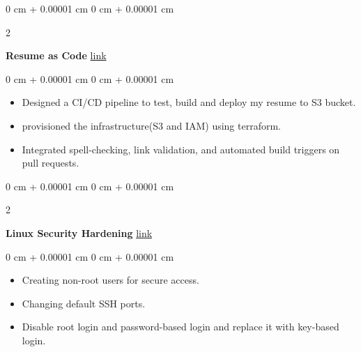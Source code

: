 \documentclass[10pt, letterpaper]{article}
\newenvironment{highlights}{
    \begin{itemize}[
        topsep=0.10 cm,
        parsep=0.10 cm,
        partopsep=0pt,
        itemsep=0pt,
        leftmargin=0 cm + 10pt
    ]
}{
    \end{itemize}
} %
\newenvironment{onecolentry}{
    \begin{adjustwidth}{
        0 cm + 0.00001 cm
    }{
        0 cm + 0.00001 cm
    }
}{
    \end{adjustwidth}
} %
\newenvironment{twocolentry}[2][]{
    \onecolentry
    \def\secondColumn{#2}
    \setcolumnwidth{\fill, 4.5 cm}
    \begin{paracol}{2}
}{
    \switchcolumn \raggedleft \secondColumn
    \end{paracol}
    \endonecolentry
} %
\begin{document}
        \vspace{0.2 cm}

        \begin{twocolentry}{
            \href{https://github.com/Charan-Sharan/resume-as-code}{link}
        }
            \textbf{Resume as Code}\end{twocolentry}

        \vspace{0.10 cm}
        \begin{onecolentry}
            \begin{highlights}
                \item Designed a CI/CD pipeline to test, build and deploy my resume to S3 bucket.
                \item provisioned the infrastructure(S3 and IAM) using terraform.
                \item Integrated spell-checking, link validation, and automated build triggers on pull requests.
            \end{highlights}
        \end{onecolentry}
        \vspace{0.2 cm}

        \begin{twocolentry}{
            \href{https://github.com/Charan-Sharan/LinuxSecurityHardening}{link}
        }
            \textbf{Linux Security Hardening}\end{twocolentry}

        \vspace{0.10 cm}
        \begin{onecolentry}
            \begin{highlights}
                \item Creating non-root users for secure access.
                \item Changing default SSH ports.
                \item Disable root login and password-based login and replace it with key-based login.
            \end{highlights}
        \end{onecolentry}
\end{document}
